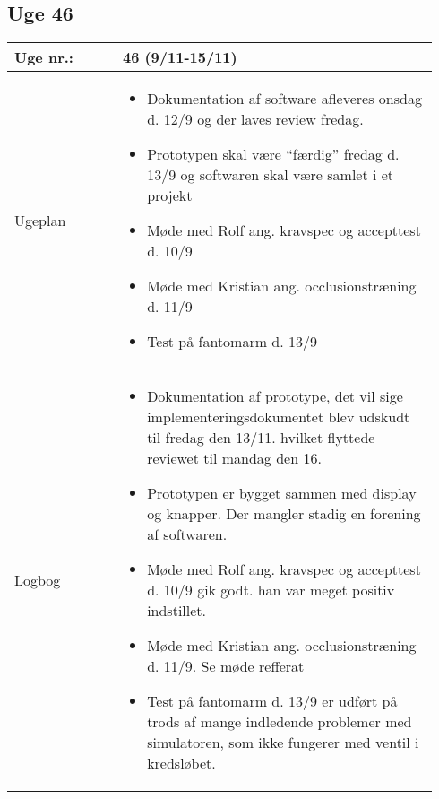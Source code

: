 	\subsection{Uge 46} \label{app:logUge46}
	\begin{longtable}{|p{0.24\linewidth}|p{0.7\linewidth}|}
		\hline
		Uge nr.: & 46 (9/11-15/11)\\ \hline
		Ugeplan & 
		\begin{itemize}
			\item Dokumentation af software afleveres onsdag d. 12/9 og der laves review fredag. 
			\item Prototypen skal være “færdig” fredag d. 13/9 og softwaren skal være samlet i et projekt
			\item Møde med Rolf ang. kravspec og accepttest d. 10/9 
			\item Møde med Kristian ang. occlusionstræning d. 11/9
			\item Test på fantomarm d. 13/9
		\end{itemize}
		
		\\ \hline
		Logbog & 
		\begin{itemize}
			\item Dokumentation af prototype, det vil sige implementeringsdokumentet blev udskudt til fredag den 13/11. hvilket flyttede reviewet til mandag den 16.
			\item Prototypen er bygget sammen med display og knapper. Der mangler stadig en forening af softwaren.
			\item Møde med Rolf ang. kravspec og accepttest d. 10/9 gik godt. han var meget positiv indstillet.
			\item Møde med Kristian ang. occlusionstræning d. 11/9. Se møde refferat
			\item Test på fantomarm d. 13/9 er udført på trods af mange indledende problemer med simulatoren, som ikke fungerer med ventil i kredsløbet.
		\end{itemize}
		\\ \hline
	\end{longtable}
	
